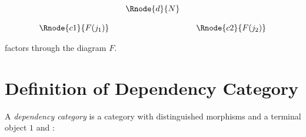 \documentclass[10pt,a4paper]{article}
\begin{document}
\begin{center}
\begin{equation}
\begin{array}{cp{0cm}cp{0cm} c}
            & &\Rnode{d}{N}                           \\ [0.4cm]
\Rnode{c1}{F(j_1)}& &                & & \Rnode{c2}{F(j_2)} 
\end{array}
\end{equation}
\end{center}

factors through the diagram $F$.

\section{Definition of Dependency Category}
A \textit{dependency category} is a category  with distinguished morphisms and a terminal object $1$ and :
\end{document}

